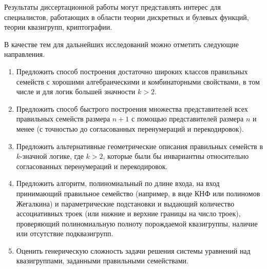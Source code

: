     Результаты диссертационной работы могут представлять интерес для специалистов, работающих в области теории дискретных и булевых функций, теории квазигрупп, криптографии.

    В качестве тем для дальнейших исследований можно отметить следующие направления.

    \begin{enumerate}
        \item Предложить способ построения достаточно широких классов правильных семейств с хорошими алгебраическими и комбинаторными свойствами, в том числе и для логик большей значности $k > 2$.

        \item Предложить способ быстрого построения множества представителей всех правильных семейств размера $n+1$ с помощью представителей размера $n$ и менее (с точностью до согласованных перенумераций и перекодировок).

        \item Предложить альтернативные геометрические описания правильных семейств в $k$-значной логике, где $k>2$, которые были бы инвариантны относительно согласованных перенумераций и перекодировок.

        \item Предложить алгоритм, полиномиальный по длине входа, на вход принимающий правильное семейство (например, в виде КНФ или полиномов Жегалкина) и параметрические подстановки и выдающий количество ассоциативных троек (или нижние и верхние границы на число троек), проверяющий полиномиальную полноту порождаемой квазигруппы, наличие или отсутствие подквазигрупп.

        \item Оценить генерическую сложность задачи решения системы уравнений над квазигруппами, заданными правильными семействами.
    \end{enumerate}
